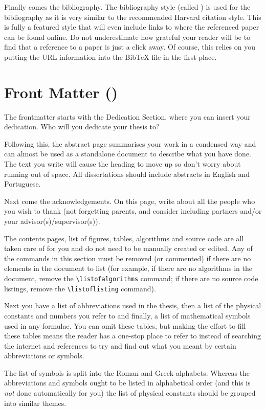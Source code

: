 Finally comes the bibliography. The bibliography style (called ) is used for the bibliography as it is very similar to the recommended Harvard citation style. This is fully a featured style that will even include links to where the referenced paper can be found online. Do not underestimate how grateful your reader will be to find that a reference to a paper is just a click away. Of course, this relies on you putting the URL information into the BibTeX file in the first place.

\section{Front Matter ()}
\label{sec:frontmatter}

The frontmatter starts with the Dedication Section, where you can insert your dedication. Who will you dedicate your thesis to?

Following this, the abstract page summarises your work in a condensed way and can almost be used as a standalone document to describe what you have done. The text you write will cause the heading to move up so don't worry about running out of space. All dissertations should include abstracts in English and Portuguese.

Next come the acknowledgements. On this page, write about all the people who you wish to thank (not forgetting parents, and consider including partners and/or your advisor(s)/supervisor(s)).

The contents pages, list of figures, tables, algorithms and source code are all taken care of for you and do not need to be manually created or edited. Any of the commands in this section must be removed (or commented) if there are no elements in the document to list (for example, if there are no algorithms in the document, remove the \verb|\listofalgorithms| command; if there are no source code listings, remove the \verb|\listoflisting| command).

Next you have a list of abbreviations used in the thesis, then a list of the physical constants and numbers you refer to and finally, a list of mathematical symbols used in any formulae. You can omit these tables, but making the effort to fill these tables means the reader has a one-stop place to refer to instead of searching the internet and references to try and find out what you meant by certain abbreviations or symbols.

The list of symbols is split into the Roman and Greek alphabets. Whereas the abbreviations and symbols ought to be listed in alphabetical order (and this is \emph{not} done automatically for you) the list of physical constants should be grouped into similar themes.

